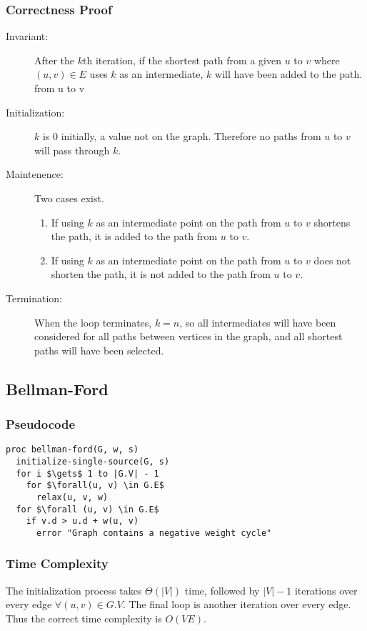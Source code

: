 \documentclass[a4paper,12pt]{article}
\begin{document}
\subsubsection{Correctness Proof}
\begin{description}
\item [Invariant: ] After the $k$th iteration, if the shortest path from a given $u$ to $v$ where $(u,v)\in E$ uses $k$ as an intermediate, $k$ will have been added to the path.
  from u to v
\item [Initialization: ] $k$ is 0 initially, a value not on the graph. Therefore no paths from $u$ to $v$ will pass through $k$.
\item [Maintenence: ] Two cases exist.
  \begin{enumerate}
  \item If using $k$ as an intermediate point on the path from $u$ to $v$ shortens the path, it is added to the path from $u$ to $v$.
  \item If using $k$ as an intermediate point on the path from $u$ to $v$ does not shorten the path, it is not added to the path from $u$ to $v$.
  \end{enumerate}
\item [Termination: ] When the loop terminates, $k = n$, so all intermediates will have been considered for all paths between vertices in the graph, and all shortest
  paths will have been selected.
\end{description}
\subsection{Bellman-Ford}
\subsubsection{Pseudocode}
\begin{lstlisting}[mathescape=true]
proc bellman-ford(G, w, s)
  initialize-single-source(G, s)
  for i $\gets$ 1 to |G.V| - 1
    for $\forall(u, v) \in G.E$
      relax(u, v, w)
  for $\forall (u, v) \in G.E$
    if v.d > u.d + w(u, v)
      error "Graph contains a negative weight cycle"
\end{lstlisting}
\subsubsection{Time Complexity}
The initialization process takes $\Theta(|V|)$ time, followed by $|V| - 1$ iterations over
every edge $\forall (u, v) \in G.V$. The final loop is another iteration over every edge.
Thus the correct time complexity is $O(VE)$.
\end{document}

